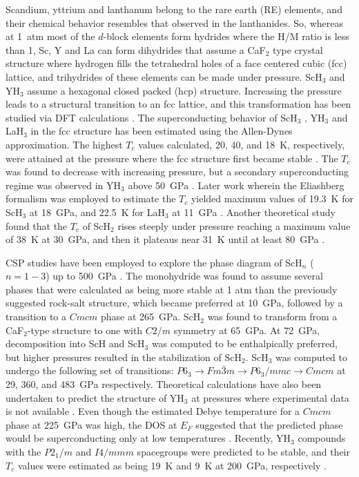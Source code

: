 \documentclass[12pt,letterpaper,oneside]{article}
\begin{document}
Scandium, yttrium and lanthanum belong to the rare earth (RE) elements, and their chemical behavior resembles that observed in the lanthanides. So, whereas at 1~atm most of the $d$-block elements form hydrides where the H/M ratio is less than 1, Sc, Y and La can form dihydrides that assume a CaF$_2$ type crystal structure where hydrogen fills the tetrahedral holes of a face centered cubic (fcc) lattice, and trihydrides of these elements can be made under pressure. ScH$_3$ and YH$_3$ assume a hexagonal closed packed (hcp) structure. Increasing the pressure leads to a structural transition to an fcc lattice, and this transformation has been studied via DFT calculations  \cite{Pakornchote:2016,Almeida:2009}. The superconducting behavior of ScH$_3$ \cite{Kim:2010a,Wei:2016a}, YH$_3$ \cite{Kim:2010a,Kim:2009} and LaH$_3$ \cite{Kim:2010a} in the fcc structure has been estimated using the Allen-Dynes approximation. The highest $T_c$ values calculated, 20, 40, and 18~K, respectively, were attained at the pressure where the fcc structure first became stable \cite{Kim:2010a}. The $T_c$ was found to decrease with increasing pressure, but a secondary superconducting regime was observed in YH$_3$ above 50~GPa \cite{Kim:2010a}. Later work wherein the Eliashberg formalism was employed to estimate the $T_c$ yielded maximum values of 19.3~K for ScH$_3$ at 18~GPa, and 22.5~K for LaH$_3$ at 11~GPa \cite{Durajski:2014a}.   Another theoretical study found that the  $T_c$ of ScH$_2$ rises steeply under pressure reaching a maximum value of 38~K at 30~GPa, and then it plateaus near 31~K until at least 80~GPa \cite{Wei:2016a}. 

CSP studies have been employed to explore the phase diagram of ScH$_{n}$ ($n = 1-3$) up to 500~GPa \cite{Ye:2015a}. The monohydride was found to assume several phases that were calculated as being more stable at 1 atm than the previously suggested rock-salt structure, which became preferred at 10~GPa, followed by a transition to a $Cmcm$ phase at 265~GPa. ScH$_2$ was found to transform from a CaF$_{2}$-type structure to one with $C2/m$ symmetry at 65~GPa. At 72~GPa, decomposition into ScH and ScH$_3$ was computed to be enthalpically preferred, but higher pressures resulted in the stabilization of ScH$_2$. ScH$_3$ was computed to undergo the following set of  transitions: $P6_3 \rightarrow Fm\bar{3}m \rightarrow P6_{3}/mmc \rightarrow Cmcm$ at 29, 360, and 483~GPa respectively. 
Theoretical calculations have also been undertaken to predict the structure of YH$_3$  at pressures where experimental data is not available \cite{Yao:2010,Liu:2017-Y}. Even though the estimated Debye temperature for a $Cmcm$ phase at 225~GPa was high, the DOS at $E_F$ suggested that the predicted phase would be superconducting only at low temperatures \cite{Yao:2010}. Recently, YH$_3$ compounds with the $P2_1/m$ and $I4/mmm$ spacegroups were predicted to be stable, and their $T_c$ values were estimated as being 19~K and 9~K at 200~GPa, respectively \cite{Liu:2017-Y}. 
\end{document}
